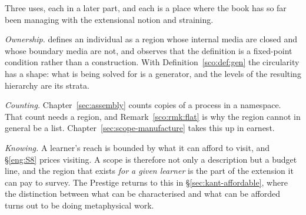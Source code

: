 Three uses, each in a later part, and each is a place where the book has
so far been managing with the extensional notion and straining.

\emph{Ownership.} \chEng defines an individual as a region whose internal
media are closed and whose boundary media are not, and observes that the
definition is a fixed-point condition rather than a construction. With
Definition~\ref{sco:def:gen} the circularity has a shape: what is being
solved for is a generator, and the levels of the resulting hierarchy are
its strata.

\emph{Counting.} Chapter~\ref{sec:assembly} counts copies of a process in
a namespace. That count needs a region, and
Remark~\ref{sco:rmk:flat} is why the region cannot in general be a list.
Chapter~\ref{sec:scope-manufacture} takes this up in earnest.

\emph{Knowing.} A learner's reach is bounded by what it can afford to
visit, and \S\ref{eng:S8} prices visiting. A scope is therefore not only a
description but a budget line, and the region that exists \emph{for a
given learner} is the part of the extension it can pay to survey. The
Prestige returns to this in \S\ref{sec:kant-affordable}, where the
distinction between what can be characterised and what can be afforded
turns out to be doing metaphysical work.

